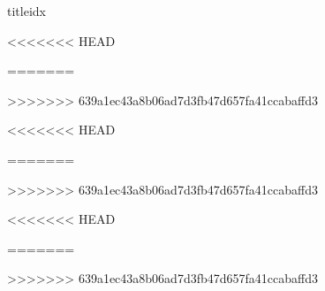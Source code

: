 \def \includeFolder{_include}








\def \gchordsVspace{5 mm}



	\songsection{} %

	\AddToShipoutPicture{\BottomPic}
	
	\begin{songs}{titleidx}
	
	
	
	
	
	
	
	
	
	
	
	
	
<<<<<<< HEAD
	
	
	
	
	
=======
	
	
    
	
	
>>>>>>> 639a1ec43a8b06ad7d3fb47d657fa41ccabaffd3
	
	
	
	
	
	
<<<<<<< HEAD
	
=======
	
>>>>>>> 639a1ec43a8b06ad7d3fb47d657fa41ccabaffd3
	
	
	
	
	
	
<<<<<<< HEAD
	
	
=======
	
	
>>>>>>> 639a1ec43a8b06ad7d3fb47d657fa41ccabaffd3
	
	
	

	 \end{songs}
	 
	 
	
